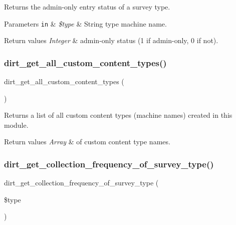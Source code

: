 Returns the admin-\/only entry status of a survey type.


\begin{DoxyParams}[1]{Parameters}
\mbox{\tt in}  & {\em \$type} & String type machine name.\\
\hline
\end{DoxyParams}

\begin{DoxyRetVals}{Return values}
{\em Integer} & admin-\/only status (1 if admin-\/only, 0 if not). \\
\hline
\end{DoxyRetVals}
\mbox{\label{dirt_8module_ad77aa7d68fd00dd691623ba7eddb2637}} 
\subsubsection{\texorpdfstring{dirt\+\_\+get\+\_\+all\+\_\+custom\+\_\+content\+\_\+types()}{dirt\_get\_all\_custom\_content\_types()}}
{\footnotesize\ttfamily dirt\+\_\+get\+\_\+all\+\_\+custom\+\_\+content\+\_\+types (\begin{DoxyParamCaption}{ }\end{DoxyParamCaption})}

Returns a list of all custom content types (machine names) created in this module.


\begin{DoxyRetVals}{Return values}
{\em Array} & of custom content type names. \\
\hline
\end{DoxyRetVals}
\mbox{\label{dirt_8module_a238fb95fed118eee2cd53bfab4afa05b}} 
\subsubsection{\texorpdfstring{dirt\+\_\+get\+\_\+collection\+\_\+frequency\+\_\+of\+\_\+survey\+\_\+type()}{dirt\_get\_collection\_frequency\_of\_survey\_type()}}
{\footnotesize\ttfamily dirt\+\_\+get\+\_\+collection\+\_\+frequency\+\_\+of\+\_\+survey\+\_\+type (\begin{DoxyParamCaption}\item[{}]{\$type }\end{DoxyParamCaption})}

